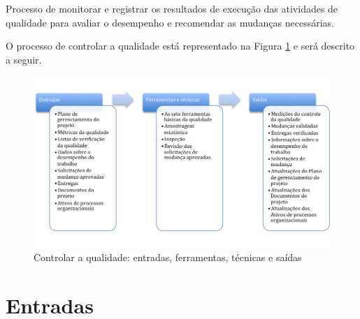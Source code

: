 
Processo de monitorar e registrar os resultados de execução das atividades de qualidade para avaliar o desempenho e recomendar as mudanças necessárias.

O processo de controlar a qualidade está representado na Figura \ref{fig:qualidade:controlar:efts} e será descrito a seguir.

\begin{figure}[!h]
	\centering
	\includegraphics[scale=0.5]{Figuras/qualidade_efts_controlar.png}
	\caption{Controlar a qualidade: entradas, ferramentas, técnicas e saídas}
	\label{fig:qualidade:controlar:efts}
\end{figure}

\section{Entradas}

